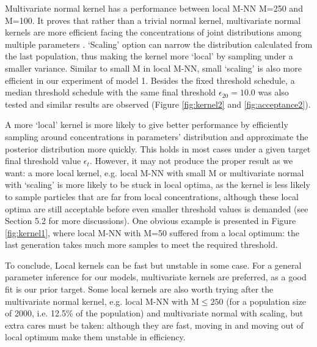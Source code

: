 Multivariate normal kernel has a performance between local M-NN M=250 and M=100. It proves that rather than a trivial normal kernel, multivariate normal kernels are more efficient facing the concentrations of joint distributions among multiple parameters \cite{ref:kernel}. `Scaling' option can narrow the distribution calculated from the last population, thus making the kernel more `local' by sampling under a smaller variance. Similar to small M in local M-NN, small `scaling' is also more efficient in our experiment of model 1. Besides the fixed threshold schedule, a median threshold schedule with the same final threshold $\epsilon_{20}=10.0$ was also tested and similar results are observed (Figure \ref{fig:kernel2} and \ref{fig:acceptance2}).

A more `local' kernel is more likely to give better performance by efficiently sampling around concentrations in parameters' distribution and approximate the posterior distribution more quickly. This holds in most cases under a given target final threshold value $\epsilon_t$. However, it may not produce the proper result as  we want: a more local kernel, e.g. local M-NN with small M or multivariate normal with `scaling' is more likely to be stuck in local optima, as the kernel is less likely to sample particles that are far from local concentrations, although these local optima are still acceptable before even smaller threshold values is demanded (see Section 5.2 for more discussions). One obvious example is presented in Figure \ref{fig:kernel1}, where local M-NN with M=50 suffered from a local optimum: the last generation takes much more samples to meet the required threshold.



To conclude, Local kernels can be fast but unstable in some case. For a general parameter inference for our models, multivariate kernels are preferred, as a good fit is our prior target. Some local kernels are also worth trying after the multivariate normal kernel, e.g. local M-NN with M$\leq 250$ (for a population size of 2000, i.e. 12.5\% of the population) and multivariate normal with scaling, but extra cares must be taken: although they are fast, moving in and moving out of local optimum make them unstable in efficiency.

